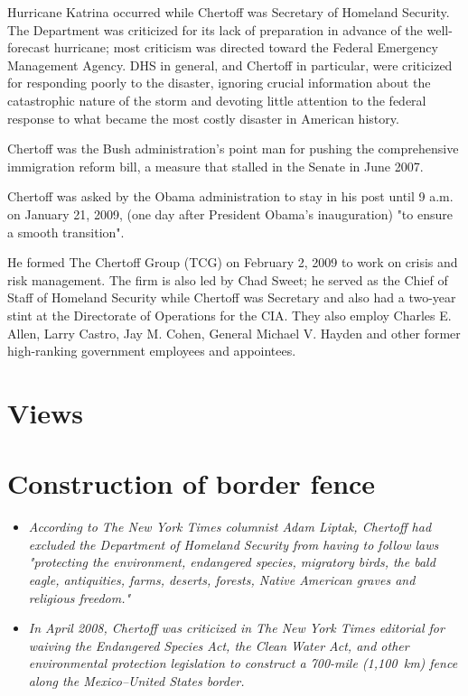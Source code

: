 Hurricane Katrina occurred while Chertoff was Secretary of Homeland
Security. The Department was criticized for its lack of preparation in
advance of the well-forecast hurricane; most criticism was directed
toward the Federal Emergency Management Agency. DHS in general, and
Chertoff in particular, were criticized for responding poorly to the
disaster, ignoring crucial information about the catastrophic nature of
the storm and devoting little attention to the federal response to what
became the most costly disaster in American history.

Chertoff was the Bush administration's point man for pushing the
comprehensive immigration reform bill, a measure that stalled in the
Senate in June 2007.

Chertoff was asked by the Obama administration to stay in his post until
9 a.m. on January 21, 2009, (one day after President Obama's
inauguration) "to ensure a smooth transition".

He formed The Chertoff Group (TCG) on February 2, 2009 to work on crisis
and risk management. The firm is also led by Chad Sweet; he served as
the Chief of Staff of Homeland Security while Chertoff was Secretary and
also had a two-year stint at the Directorate of Operations for the CIA.
They also employ Charles E. Allen, Larry Castro, Jay M. Cohen, General
Michael V. Hayden and other former high-ranking government employees and
appointees.

\section{Views}\label{views}

\section{Construction of border
fence}\label{construction-of-border-fence}

\begin{itemize}
\item
  \emph{According to The New York Times columnist Adam Liptak, Chertoff
  had excluded the Department of Homeland Security from having to follow
  laws "protecting the environment, endangered species, migratory birds,
  the bald eagle, antiquities, farms, deserts, forests, Native American
  graves and religious freedom."}
\item
  \emph{In April 2008, Chertoff was criticized in The New York Times
  editorial for waiving the Endangered Species Act, the Clean Water Act,
  and other environmental protection legislation to construct a 700-mile
  (1,100~km) fence along the Mexico--United States border.}
\end{itemize}

